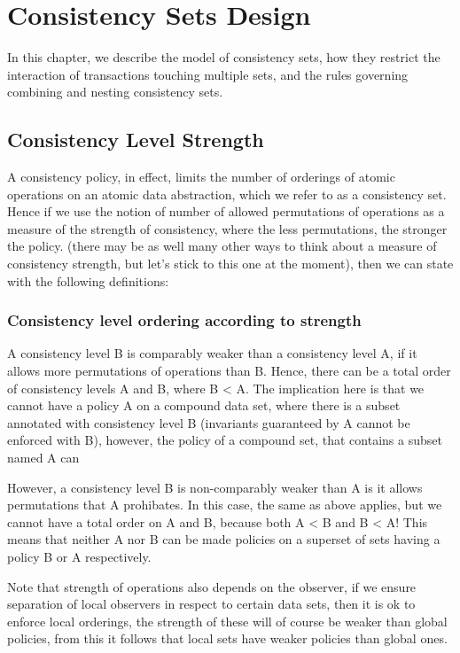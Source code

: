 

\section{Consistency Sets Design}

In this chapter, we describe the model of consistency sets, how they restrict
the interaction of transactions touching multiple sets, and the rules governing
combining and nesting consistency sets.

\subsection{Consistency Level Strength}
A consistency policy, in effect, limits the number of orderings of atomic
operations on an atomic data abstraction, which we refer to as a consistency
set. Hence if we use the notion of number
of allowed permutations of operations as a measure of the strength of
consistency, where the less permutations, the stronger the policy.
(there may be as well many other ways to think about a measure of
consistency strength, but let's stick to this one at the moment), then we can
state with the following definitions:

\subsubsection{Consistency level ordering according to strength}
A consistency level B is comparably weaker than a consistency level A, if it
allows more permutations of operations than B. Hence, there can be a total order
of consistency levels A and B, where B < A. The implication here is that we
cannot have a policy A on a compound data set, where there is a subset annotated
with consistency level B (invariants guaranteed by A cannot be enforced with B),
however, the policy of a compound set, that contains a subset named A can 

However, a consistency level B is non-comparably weaker than A is it allows
permutations that A prohibates. In this case, the same as above applies, but we
cannot have a total order on A and B, because both A < B and B < A! This means
that neither A nor B can be made policies on a superset of sets having a policy
B or A respectively. 

Note that strength of operations also depends on the observer, if we ensure
separation of local observers in respect to certain data sets, then it is ok to
enforce local orderings, the strength of these will of course be weaker than
global policies, from this it follows that local sets have weaker policies than
global ones.

